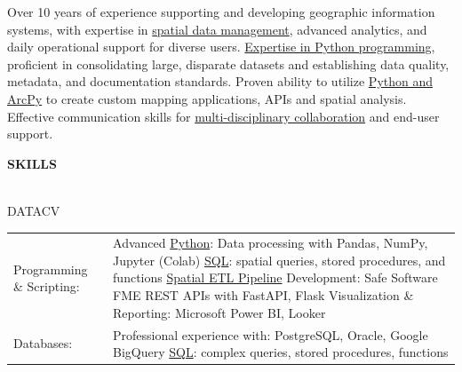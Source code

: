 \documentclass[letterpaper]{article}
\newcommand{\lineunder} {
        \vspace*{-8pt} \\
        \hspace*{-18pt} \hrulefill \\
    }
\newcommand{\header} [1] {
        \vspace{9pt}
        {\hspace*{-18pt}\vspace*{6pt} \large \textbf {#1}}
        \vspace*{-6pt} \lineunder
        \vspace{2pt}
    }
\newenvironment{skillslist}
        {
            \hspace*{-0.07in}\begin{tabular}[t]{ l L{5.17in} }
        }{
            \end{tabular}
        }
\newcommand{\impt}[1]{\uline{#1}}
\begin{document}
{%
Over 10 years of experience supporting and developing geographic information systems,
with expertise in \impt{spatial data management}, advanced analytics, and daily operational support for diverse users.
\impt{Expertise in Python programming}, proficient in consolidating large,
disparate datasets and establishing data quality, metadata, and documentation standards.
Proven ability to utilize \impt{Python and ArcPy} to create custom mapping applications, APIs and spatial analysis.
Effective communication skills for \impt{multi-disciplinary collaboration} and end-user support.

}


\header{SKILLS}
    \begin{taggedblock}{DATACV}
        \begin{skillslist}
            Programming \& Scripting:&
                Advanced \impt{Python}: Data processing with Pandas, NumPy, Jupyter (Colab) \linebreak
                \impt{SQL}: spatial queries, stored procedures, and functions \linebreak
                \impt{Spatial ETL Pipeline} Development: Safe Software FME \linebreak
                REST APIs with FastAPI, Flask \linebreak
                Visualization \& Reporting: Microsoft Power BI, Looker \linebreak
                \\
            Databases:&
                Professional experience with: PostgreSQL, Oracle, Google BigQuery \linebreak
                \impt{SQL}: complex queries, stored procedures, functions \linebreak

\end{skillslist}
\end{taggedblock}
\end{document}
